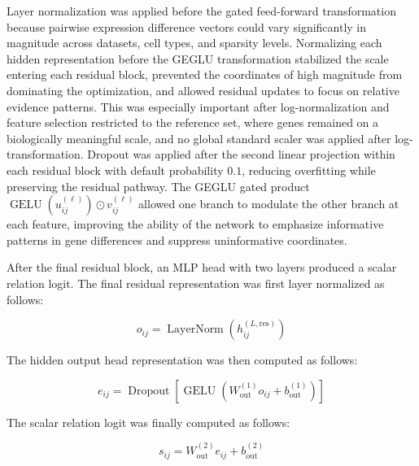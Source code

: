 \documentclass[11pt]{article}
\begin{document}
Layer normalization was applied before the gated feed-forward transformation because pairwise expression difference vectors could vary significantly in magnitude across datasets, cell types, and sparsity levels. Normalizing each hidden representation before the GEGLU transformation stabilized the scale entering each residual block, prevented the coordinates of high magnitude from dominating the optimization, and allowed residual updates to focus on relative evidence patterns. This was especially important after log-normalization and feature selection restricted to the reference set, where genes remained on a biologically meaningful scale, and no global standard scaler was applied after log-transformation. Dropout was applied after the second linear projection within each residual block with default probability $0.1$, reducing overfitting while preserving the residual pathway. The GEGLU gated product $\operatorname{GELU}(u_{ij}^{(\ell)})\odot v_{ij}^{(\ell)}$ allowed one branch to modulate the other branch at each feature, improving the ability of the network to emphasize informative patterns in gene differences and suppress uninformative coordinates.

After the final residual block, an MLP head with two layers produced a scalar relation logit. The final residual representation was first layer normalized as follows:

\begin{equation}
o_{ij}=
\operatorname{LayerNorm}
\left(
h_{ij}^{(L,\mathrm{res})}
\right)
  \label{eq:o}
\end{equation}

The hidden output head representation was then computed as follows:

\begin{equation}
e_{ij}=
\operatorname{Dropout}
\left[
\operatorname{GELU}
\left(
W_{\mathrm{out}}^{(1)}o_{ij}+
b_{\mathrm{out}}^{(1)}
\right)
\right]
  \label{eq:e}
\end{equation}

The scalar relation logit was finally computed as follows:

\begin{equation}
s_{ij}=
W_{\mathrm{out}}^{(2)}e_{ij}+
b_{\mathrm{out}}^{(2)}
  \label{eq:s}
\end{equation}
\end{document}
